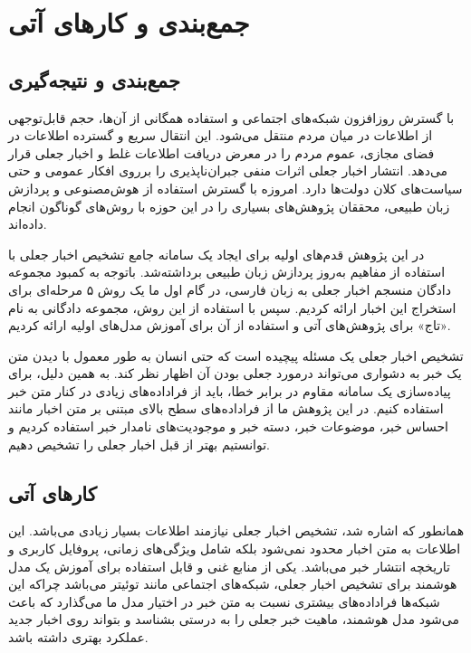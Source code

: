 \chapter{جمع‌بندی و کارهای آتی}
\section{جمع‌بندی و نتیجه‌گیری}
با گسترش روزافزون شبکه‌های اجتماعی و استفاده همگانی از آن‌ها، حجم قابل‌توجهی از اطلاعات در میان مردم منتقل می‌شود. این انتقال سریع و گسترده اطلاعات در فضای مجازی، عموم مردم را در معرض دریافت اطلاعات غلط و اخبار جعلی قرار می‌دهد. انتشار اخبار جعلی اثرات منفی جبران‌ناپذیری را برروی افکار عمومی و حتی سیاست‌های کلان دولت‌ها دارد. امروزه با گسترش استفاده از هوش‌مصنوعی و پردازش زبان طبیعی، محققان پژوهش‌های بسیاری را در این حوزه با روش‌های گوناگون انجام داده‌اند.

در این پژوهش قدم‌های اولیه برای ایجاد یک سامانه جامع تشخیص اخبار جعلی با استفاده از مفاهیم به‌روز پردازش زبان طبیعی برداشته‌شد. باتوجه به کمبود مجموعه دادگان منسجم اخبار جعلی به زبان فارسی، در گام اول ما یک روش ۵ مرحله‌ای برای استخراج این اخبار ارائه کردیم. سپس با استفاده از این روش، مجموعه‌ دادگانی به نام «تاج» برای پژوهش‌های آتی و استفاده از آن برای آموزش مدل‌های اولیه ارائه کردیم.

تشخیص اخبار جعلی یک مسئله پیچیده است که حتی انسان به طور معمول با دیدن متن یک خبر به دشواری می‌تواند درمورد جعلی بودن آن اظهار نظر کند. به همین دلیل، برای پیاده‌سازی یک سامانه مقاوم در برابر خطا، باید از فراداده‌های زیادی در کنار متن خبر استفاده کنیم. در این پژوهش ما از فراداده‌های سطح بالای مبتنی بر متن اخبار مانند احساس خبر، موضوعات خبر، دسته خبر و موجودیت‌های نامدار خبر استفاده کردیم و توانستیم بهتر از قبل اخبار جعلی را تشخیص دهیم.

\section{کار‌های آتی}
همانطور که اشاره شد، تشخیص اخبار جعلی نیازمند اطلاعات بسیار زیادی می‌باشد. این اطلاعات به متن اخبار محدود نمی‌شود بلکه شامل ویژگی‌های زمانی، پروفایل کاربری و تاریخچه انتشار خبر می‌باشد. یکی از منابع غنی و قابل استفاده برای آموزش یک مدل هوشمند برای تشخیص اخبار جعلی، شبکه‌‌های اجتماعی مانند توئیتر می‌باشد چراکه این شبکه‌ها فراداده‌های بیشتری نسبت به متن خبر در اختیار مدل ما می‌گذارد که باعث می‌شود مدل هوشمند، ماهیت خبر جعلی را به درستی بشناسد و بتواند روی اخبار جدید عملکرد بهتری داشته باشد.